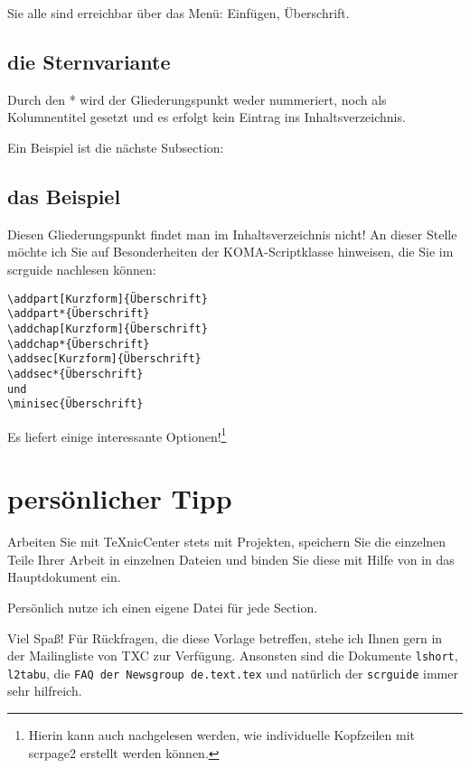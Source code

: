 \documentclass[a4paper,%
twoside,							%
headsepline=true,					%
footsepline=true,					%
headings=normal,
listof=totoc,					%
bibliography=totoc			%
]
{scrartcl}
\begin{document}
Sie alle sind erreichbar über das Menü: Einfügen, Überschrift.

\subsection{die Sternvariante}
Durch den * wird der Gliederungspunkt weder nummeriert, noch als Kolumnentitel gesetzt und es erfolgt kein Eintrag
ins Inhaltsverzeichnis.

Ein Beispiel ist die nächste Subsection:

\subsection*{das Beispiel}
Diesen Gliederungspunkt findet man im Inhaltsverzeichnis nicht!
An dieser Stelle möchte ich Sie auf Besonderheiten der KOMA-Scriptklasse hinweisen, die Sie im scrguide nachlesen können:
\begin{verbatim}
\addpart[Kurzform]{Überschrift}
\addpart*{Überschrift}
\addchap[Kurzform]{Überschrift}
\addchap*{Überschrift}
\addsec[Kurzform]{Überschrift}
\addsec*{Überschrift}
und
\minisec{Überschrift}
\end{verbatim}
Es liefert einige interessante Optionen!\footnote{Hierin kann auch nachgelesen werden, wie individuelle Kopfzeilen mit scrpage2 erstellt werden können.}

\section{persönlicher Tipp}
Arbeiten Sie mit TeXnicCenter stets mit Projekten, speichern Sie die einzelnen Teile Ihrer Arbeit in einzelnen Dateien und binden Sie diese mit Hilfe von \verb## in das Hauptdokument ein.

Persönlich nutze ich einen eigene Datei für jede Section. 

Viel Spaß! Für Rückfragen, die diese Vorlage betreffen, stehe ich Ihnen gern in der Mailingliste von TXC zur Verfügung. Ansonsten sind die Dokumente \texttt{lshort}, \texttt{l2tabu}, die \texttt{FAQ der Newsgroup de.text.tex} und natürlich der \texttt{scrguide} immer sehr hilfreich.

%
\newpage
{}
\renewcommand{\refname}{Quellenverzeichnis}
\nocite{*} %
\printbibliography
\end{document}

